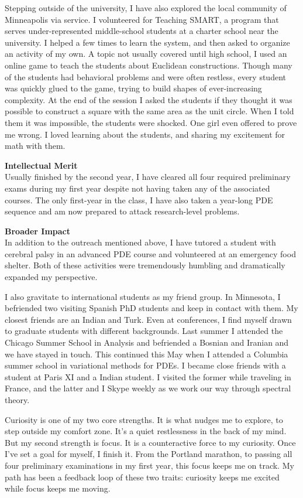 \documentclass[12pt]{article}
\begin{document}
Stepping outside of the university, I have also explored the local community of Minneapolis via service. I volunteered for Teaching SMART, a program that serves under-represented middle-school students at a charter school near the university. I helped a few times to learn the system, and then asked to organize an activity of my own. A topic not usually covered until high school, I used an online game to teach the students about Euclidean constructions. Though many of the students had behavioral problems and were often restless, every student was quickly glued to the game, trying to build shapes of ever-increasing complexity. At the end of the session I asked the students if they thought it was possible to construct a square with the same area as the unit circle. When I told them it was impossible, the students were shocked. One girl even offered to prove me wrong. I loved learning about the students, and sharing my excitement for math with them.


\textbf{Intellectual Merit}\\
Usually finished by the second year, I have cleared all four required preliminary exams during my first year despite not having taken any of the associated courses. The only first-year in the class, I have also taken a year-long PDE sequence and am now prepared to attack research-level problems. 

\textbf{Broader Impact}\\
In addition to the outreach mentioned above, I have tutored a student with cerebral palsy in an advanced PDE course and volunteered at an emergency food shelter. Both of these activities were tremendously humbling and dramatically expanded my perspective.

I also gravitate to international students as my friend group. In Minnesota, I befriended two visiting Spanish PhD students and keep in contact with them. My closest friends are an Indian and Turk. Even at conferences, I find myself drawn to graduate students with different backgrounds. Last summer I attended the Chicago Summer School in Analysis and befriended a Bosnian and Iranian and we have stayed in touch. This continued this May when I attended a Columbia summer school in variational methods for PDEs. I became close friends with a student at Paris XI and a Indian student. I visited the former while traveling in France, and the latter and I Skype weekly as we work our way through spectral theory.

Curiosity is one of my two core strengths. It is what nudges me to explore, to step outside my comfort zone. It's a quiet restlessness in the back of my mind. But my second strength is focus. It is a counteractive force to my curiosity. Once I've set a goal for myself, I finish it. From the Portland marathon, to passing all four preliminary examinations in my first year, this focus keeps me on track. My path has been a feedback loop of these two traits: curiosity keeps me excited while focus keeps me moving. 
\end{document}
